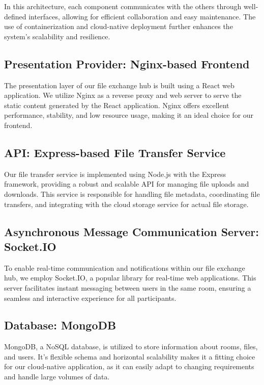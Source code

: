 \documentclass[a4paper,fleqn]{cas-dc}
\begin{document}
In this architecture, each component communicates with the others through well-defined interfaces, allowing for efficient collaboration and easy maintenance. The use of containerization and cloud-native deployment further enhances the system's scalability and resilience.

\subsection{Presentation Provider: Nginx-based Frontend}

The presentation layer of our file exchange hub is built using a React web application. We utilize Nginx as a reverse proxy and web server to serve the static content generated by the React application. Nginx offers excellent performance, stability, and low resource usage, making it an ideal choice for our frontend.

\subsection{API: Express-based File Transfer Service}

Our file transfer service is implemented using Node.js with the Express framework, providing a robust and scalable API for managing file uploads and downloads. This service is responsible for handling file metadata, coordinating file transfers, and integrating with the cloud storage service for actual file storage.

\subsection{Asynchronous Message Communication Server: Socket.IO}

To enable real-time communication and notifications within our file exchange hub, we employ Socket.IO, a popular library for real-time web applications. This server facilitates instant messaging between users in the same room, ensuring a seamless and interactive experience for all participants.

\subsection{Database: MongoDB}

MongoDB, a NoSQL database, is utilized to store information about rooms, files, and users. It's flexible schema and horizontal scalability makes it a fitting choice for our cloud-native application, as it can easily adapt to changing requirements and handle large volumes of data.
\end{document}
